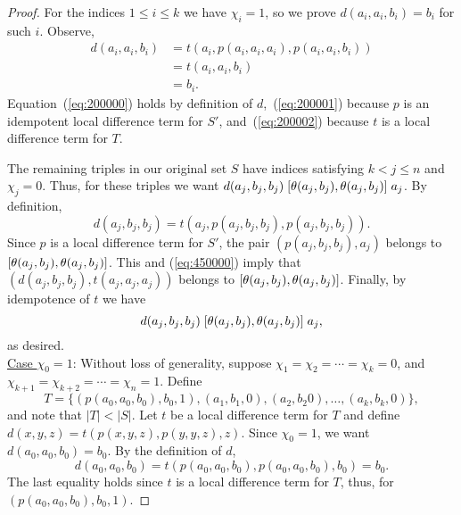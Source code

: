\begin{proof}
For the indices $1\leq i \leq k$ we have $\chi_i =1$, so we prove
$d(a_i,a_i,b_i) = b_i$ for such $i$. Observe,
\begin{align}
  d(a_i,a_i,b_i) &=
  t(a_i, p(a_i,a_i,a_i), p(a_i,a_i,b_i)) \label{eq:200000}\\
  &=t(a_i, a_i, b_i) \label{eq:200001}\\
  &=b_i. \label{eq:200002}
\end{align}
Equation~(\ref{eq:200000}) holds by definition of $d$,~(\ref{eq:200001})
because $p$ is an idempotent local difference term for
$S'$, and~(\ref{eq:200002}) because $t$ is a local difference term for $T$.

The remaining triples in our original set $S$
have indices satisfying $k<j\leq n$ and $\chi_j = 0$.
Thus, for these triples we want
$d(a_j,b_j,b_j)\mathrel{[\theta(a_j,b_j), \theta(a_j,b_j)]} a_j$.
By definition,
\begin{equation}
  \label{eq:450000}
d(a_j,b_j,b_j) =t(a_j, p(a_j,b_j,b_j), p(a_j,b_j,b_j)).  
\end{equation}
Since $p$ is a local difference term for $S'$, %
the pair $(p(a_j,b_j,b_j), a_j)$ belongs to $[\theta(a_j,b_j), \theta(a_j,b_j)]$.
This and 
(\ref{eq:450000}) imply
that 
$(d(a_j, b_j,b_j), t(a_j,a_j,a_j))$
belongs to
$\mathrel{[\theta(a_j,b_j), \theta(a_j,b_j)]}$.
Finally, by idempotence of $t$ we have
\[
d(a_j,b_j,b_j)\mathrel{[\theta(a_j,b_j), \theta(a_j,b_j)]} a_j,\]
as desired.
\\[6pt]
\underline{Case $\chi_0 = 1$}:
Without loss of generality, suppose $\chi_1 = \chi_2 =\cdots =\chi_k = 0$,
and $\chi_{k+1} = \chi_{k+2} = \cdots = \chi_{n} = 1$. Define 
\[
T = \{(p(a_0, a_0, b_0), b_0, 1),
(a_1, b_1, 0), (a_2, b_2 0), \dots, (a_k, b_k, 0)\},
\]
and note that $|T| < |S|$.
Let $t$ be a local difference term for $T$ and
define
$d(x,y,z) = t(p(x,y,z), p(y,y,z), z)$. 
Since $\chi_0 =1$, we want $d(a_0,a_0,b_0) = b_0$. By the definition of
$d$,
\begin{equation*}
  d(a_0,a_0,b_0) =
  t(p(a_0,a_0,b_0), p(a_0,a_0,b_0), b_0) =b_0.
\end{equation*}
The last equality holds since $t$ is a local difference term for $T$, thus,
for $(p(a_0, a_0, b_0), b_0, 1)$.


\end{proof}

